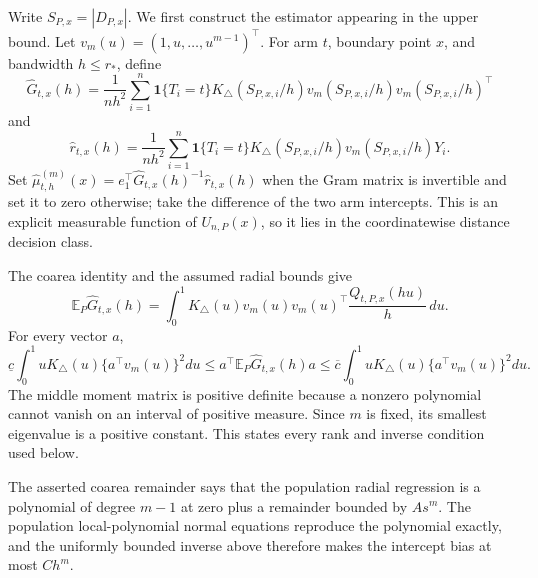 Write \(S_{P,x}=|D_{P,x}|\).  We first construct the estimator appearing in the upper bound.  Let \(v_m(u)=(1,u,\ldots,u^{m-1})^\top\).  For arm \(t\), boundary point \(x\), and bandwidth \(h\leq r_*\), define
\[
\widehat G_{t,x}(h)
=\frac1{nh^2}\sum_{i=1}^n\mathbf 1\{T_i=t\}
K_\triangle(S_{P,x,i}/h)v_m(S_{P,x,i}/h)v_m(S_{P,x,i}/h)^\top
\]
and
\[
\widehat r_{t,x}(h)
=\frac1{nh^2}\sum_{i=1}^n\mathbf 1\{T_i=t\}
K_\triangle(S_{P,x,i}/h)v_m(S_{P,x,i}/h)Y_i.
\]
Set \(\widehat\mu^{(m)}_{t,h}(x)=e_1^\top\widehat G_{t,x}(h)^{-1}\widehat r_{t,x}(h)\) when the Gram matrix is invertible and set it to zero otherwise; take the difference of the two arm intercepts.  This is an explicit measurable function of \(U_{n,P}(x)\), so it lies in the coordinatewise distance decision class.

The coarea identity and the assumed radial bounds give
\[
\mathbb E_P\widehat G_{t,x}(h)
=\int_0^1K_\triangle(u)v_m(u)v_m(u)^\top\frac{Q_{t,P,x}(hu)}h\,du.
\]
For every vector \(a\),
\[
\underline c\int_0^1uK_\triangle(u)\{a^\top v_m(u)\}^2du
\leq a^\top\mathbb E_P\widehat G_{t,x}(h)a
\leq\overline c\int_0^1uK_\triangle(u)\{a^\top v_m(u)\}^2du.
\]
The middle moment matrix is positive definite because a nonzero polynomial cannot vanish on an interval of positive measure.  Since \(m\) is fixed, its smallest eigenvalue is a positive constant.  This states every rank and inverse condition used below.

The asserted coarea remainder says that the population radial regression is a polynomial of degree \(m-1\) at zero plus a remainder bounded by \(As^m\).  The population local-polynomial normal equations reproduce the polynomial exactly, and the uniformly bounded inverse above therefore makes the intercept bias at most \(Ch^m\).

